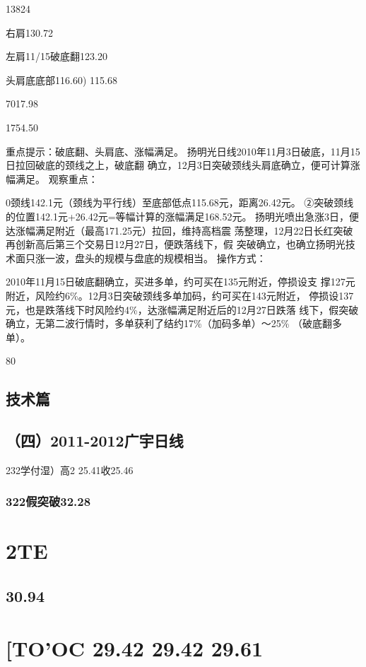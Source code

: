 \documentclass{article}
\begin{document}
13824

右肩130.72

左肩11/15破底翻123.20

头肩底底部116.60) 115.68

7017.98

1754.50

重点提示：破底翻、头肩底、涨幅满足。 扬明光日线2010年11月3日破底，11月15日拉回破底的颈线之上，破底翻 确立，12月3日突破颈线头肩底确立，便可计算涨幅满足。 观察重点：

0颈线142.1元（颈线为平行线）至底部低点115.68元，距离26.42元。 ②突破颈线的位置142.1元+26.42元=等幅计算的涨幅满足168.52元。 扬明光喷出急涨3日，便达涨幅满足附近（最高171.25元）拉回，维持高档震 荡整理，12月22日长红突破再创新高后第三个交易日12月27日，便跌落线下，假 突破确立，也确立扬明光技术面只涨一波，盘头的规模与盘底的规模相当。 操作方式：

2010年11月15日破底翻确立，买进多单，约可买在135元附近，停损设支 撑127元附近，风险约6\%。12月3日突破颈线多单加码，约可买在143元附近， 停损设137元，也是跌落线下时风险约4\%，达涨幅满足附近后的12月27日跌落 线下，假突破确立，无第二波行情时，多单获利了结约17\%（加码多单）～25\% （破底翻多单）。

80

\clearpage

\subsection{技术篇}

\subsection{（四）2011-2012广宇日线}

232学付湿）高2 25.41收25.46

\subsubsection{322假突破32.28}

\section{2TE}

\subsection{30.94}

\section{[TO'OC 29.42 29.42 29.61}
\end{document}

